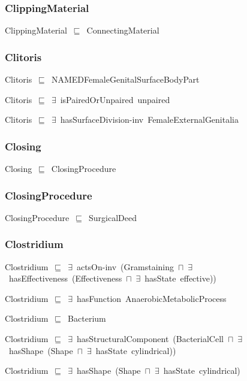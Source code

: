 \documentclass{article}
\begin{document}
\subsubsection*{ClippingMaterial}

ClippingMaterial~\ensuremath{\sqsubseteq}~ConnectingMaterial~

\subsubsection*{Clitoris}

Clitoris~\ensuremath{\sqsubseteq}~NAMEDFemaleGenitalSurfaceBodyPart~

Clitoris~\ensuremath{\sqsubseteq}~\ensuremath{\exists}~isPairedOrUnpaired~unpaired~

Clitoris~\ensuremath{\sqsubseteq}~\ensuremath{\exists}~hasSurfaceDivision-inv~FemaleExternalGenitalia~

\subsubsection*{Closing}

Closing~\ensuremath{\sqsubseteq}~ClosingProcedure~

\subsubsection*{ClosingProcedure}

ClosingProcedure~\ensuremath{\sqsubseteq}~SurgicalDeed~

\subsubsection*{Clostridium}

Clostridium~\ensuremath{\sqsubseteq}~\ensuremath{\exists}~actsOn-inv~(Gramstaining~\ensuremath{\sqcap}~\ensuremath{\exists}~hasEffectiveness~(Effectiveness~\ensuremath{\sqcap}~\ensuremath{\exists}~hasState~effective))~

Clostridium~\ensuremath{\sqsubseteq}~\ensuremath{\exists}~hasFunction~AnaerobicMetabolicProcess~

Clostridium~\ensuremath{\sqsubseteq}~Bacterium~

Clostridium~\ensuremath{\sqsubseteq}~\ensuremath{\exists}~hasStructuralComponent~(BacterialCell~\ensuremath{\sqcap}~\ensuremath{\exists}~hasShape~(Shape~\ensuremath{\sqcap}~\ensuremath{\exists}~hasState~cylindrical))~

Clostridium~\ensuremath{\sqsubseteq}~\ensuremath{\exists}~hasShape~(Shape~\ensuremath{\sqcap}~\ensuremath{\exists}~hasState~cylindrical)~
\end{document}
